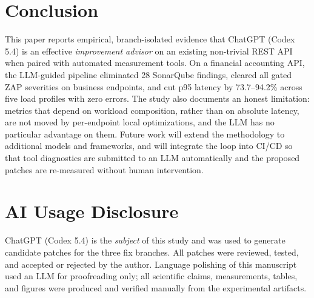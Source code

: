 \documentclass[conference]{IEEEtran}
\begin{document}
\section{Conclusion}
This paper reports empirical, branch-isolated evidence that ChatGPT (Codex 5.4) is an effective \emph{improvement advisor} on an existing non-trivial REST API when paired with automated measurement tools. On a financial accounting API, the LLM-guided pipeline eliminated 28 SonarQube findings, cleared all gated ZAP severities on business endpoints, and cut p95 latency by 73.7--94.2\% across five load profiles with zero errors. The study also documents an honest limitation: metrics that depend on workload composition, rather than on absolute latency, are not moved by per-endpoint local optimizations, and the LLM has no particular advantage on them. Future work will extend the methodology to additional models and frameworks, and will integrate the loop into CI/CD so that tool diagnostics are submitted to an LLM automatically and the proposed patches are re-measured without human intervention.

\section*{AI Usage Disclosure}
ChatGPT (Codex 5.4) is the \emph{subject} of this study and was used to generate candidate patches for the three fix branches. All patches were reviewed, tested, and accepted or rejected by the author. Language polishing of this manuscript used an LLM for proofreading only; all scientific claims, measurements, tables, and figures were produced and verified manually from the experimental artifacts.
\end{document}
